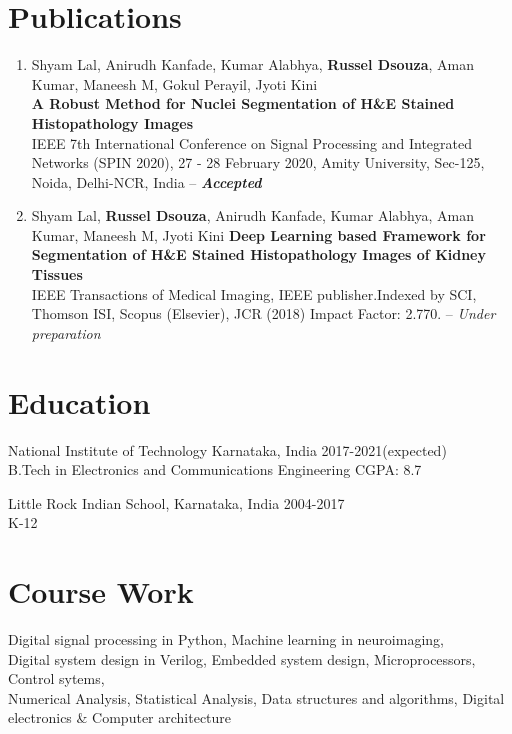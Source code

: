 \documentclass[letterpaper]{article}
\renewenvironment{itemize}{
  \begin{list}{}{
    \setlength{\leftmargin}{1.5em}
  }
}{
  \end{list}
}
\newcommand{\smallGreyFont}[1]{\textcolor{black!80}{\small{#1}}}
\begin{document}
\section*{Publications}
  \begin{enumerate}
    \item Shyam Lal, Anirudh Kanfade, Kumar Alabhya, \textbf{Russel Dsouza}, Aman Kumar, Maneesh M, Gokul Perayil, Jyoti Kini \\
    \textbf{A Robust Method for Nuclei Segmentation of H\&E Stained Histopathology Images}\\
    IEEE 7th International Conference on Signal Processing and Integrated Networks (SPIN 2020), 27 - 28 February 2020, Amity University, Sec-125, Noida, Delhi-NCR, India -- \textit{\textbf{Accepted}}

    \item Shyam Lal, \textbf{Russel Dsouza}, Anirudh Kanfade, Kumar Alabhya, Aman Kumar, Maneesh M, Jyoti Kini
    \textbf{Deep Learning based Framework for Segmentation of H\&E Stained Histopathology Images of Kidney Tissues}\\
    IEEE Transactions of Medical Imaging, IEEE publisher.Indexed by SCI, Thomson ISI, Scopus (Elsevier), JCR (2018) Impact Factor: 2.770. -- \textit{Under preparation}
  \end{enumerate}


\section*{Education}
  \begin{itemize}
    \item National Institute of Technology Karnataka, India\hfill
    \smallGreyFont{2017-2021(expected)}
    \\
    \smallGreyFont{B.Tech in Electronics and Communications Engineering}
    \hfill{\smallGreyFont{CGPA: 8.7}}

    \item Little Rock Indian School, Karnataka, India\hfill
    \smallGreyFont{2004-2017}
    \\
    \smallGreyFont{K-12}
  \end{itemize}



\section*{Course Work}
  \begin{itemize}
    \item  Digital signal processing in Python, Machine learning in neuroimaging, \\
    Digital system design in Verilog, Embedded system design,
    Microprocessors, Control sytems,\\
    Numerical Analysis, Statistical Analysis, Data structures and algorithms, Digital electronics \& Computer architecture
  \end{itemize}
\end{document}
